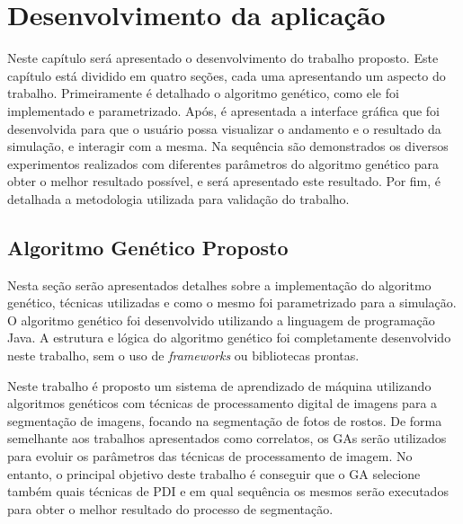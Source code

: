 \documentclass[12pt,oneside,a4paper,english,french,spanish,brazil,]{abntex2}
\begin{document}
\chapter{Desenvolvimento da aplicação}
\label{chap:Desenvolvimento}

Neste capítulo será apresentado o desenvolvimento do trabalho proposto. Este capítulo está dividido em quatro seções, cada uma apresentando um aspecto do trabalho. Primeiramente é detalhado o algoritmo genético, como ele foi implementado e parametrizado. Após, é apresentada a interface gráfica que foi desenvolvida para que o usuário possa visualizar o andamento e o resultado da simulação, e interagir com a mesma. Na sequência são demonstrados os diversos experimentos realizados com diferentes parâmetros do algoritmo genético para obter o melhor resultado possível, e será apresentado este resultado. Por fim, é detalhada a metodologia utilizada para validação do trabalho.

\section{Algoritmo Genético Proposto}

Nesta seção serão apresentados detalhes sobre a implementação do algoritmo genético, técnicas utilizadas e como o mesmo foi parametrizado para a simulação. O algoritmo genético foi desenvolvido utilizando a linguagem de programação Java. A estrutura e lógica do algoritmo genético foi completamente desenvolvido neste trabalho, sem o uso de \textit{frameworks} ou bibliotecas prontas.

Neste trabalho é proposto um sistema de aprendizado de máquina utilizando algoritmos genéticos com técnicas de processamento digital de imagens para a segmentação de imagens, focando na segmentação de fotos de rostos. De forma semelhante aos trabalhos apresentados como correlatos, os GAs serão utilizados para evoluir os parâmetros das técnicas de processamento de imagem. No entanto, o principal objetivo deste trabalho é conseguir que o GA selecione também quais técnicas de PDI e em qual sequência os mesmos serão executados para obter o melhor resultado do processo de segmentação.
\end{document}

